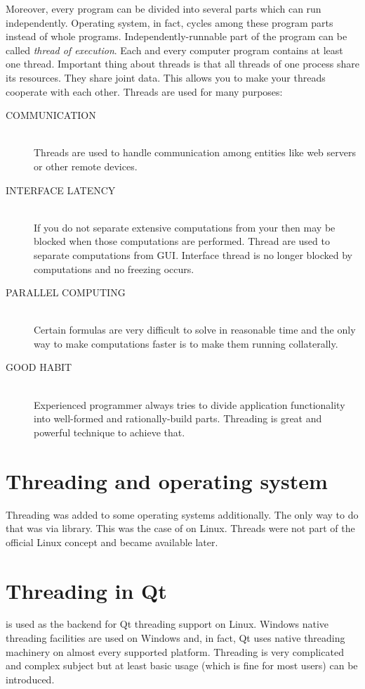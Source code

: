 Moreover, every program can be divided into several parts which can run independently. Operating system, in fact, cycles among these program parts instead of whole programs. Independently-runnable part of the program can be called \textit{thread of execution}. Each and every computer program contains at least one thread. Important thing about threads is that all threads of one process share its resources. They share joint data. This allows you to make your threads cooperate with each other. Threads are used for many purposes:
\begin{description}
\item[COMMUNICATION] \hfill \\
Threads are used to handle communication among entities like web servers or other remote devices.
\item[INTERFACE LATENCY] \hfill \\
If you do not separate extensive computations from your  then  may be blocked when those computations are performed. Thread are used to separate computations from GUI. Interface thread is no longer blocked by computations and no freezing occurs.
\item[PARALLEL COMPUTING] \hfill \\
Certain formulas are very difficult to solve in reasonable time and the only way to make computations faster is to make them running collaterally.
\item[GOOD HABIT] \hfill \\
Experienced programmer always tries to divide application functionality into well-formed and rationally-build parts. Threading is great and powerful technique to achieve that.
\end{description}

\section{Threading and operating system}
Threading was added to some operating systems additionally. The only way to do that was via library. This was the case of  on Linux. Threads were not part of the official Linux concept and became available later.

\section{Threading in Qt}
 is used as the backend for Qt threading support on Linux. Windows native threading facilities are used on Windows and, in fact, Qt uses native threading machinery on almost every supported platform. Threading is very complicated and complex subject but at least basic usage (which is fine for most users) can be introduced.


